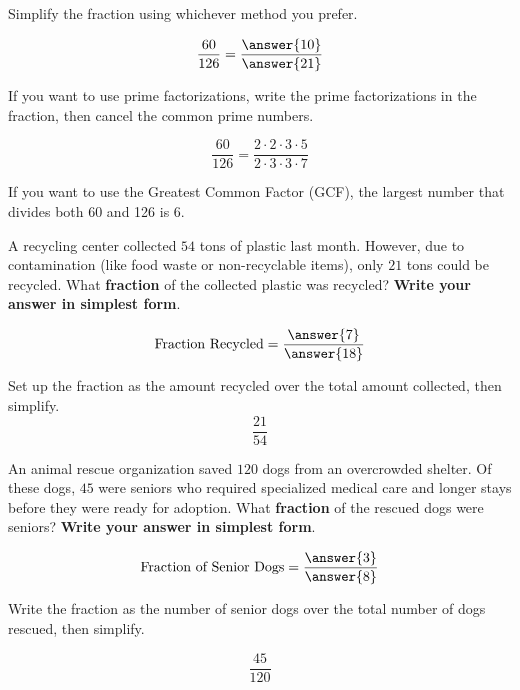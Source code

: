 \documentclass{ximera}[font=12pt]  %
\begin{document}
\begin{problem}
  Simplify the fraction using whichever method you prefer.


  \[ \frac{60}{126} = \frac{\answer{10}}{\answer{21}} \]

  \begin{hint}
   If you want to use prime factorizations, write the prime factorizations in the fraction, then cancel the common prime numbers.

    \[ \frac{60}{126} = \frac{2 \cdot 2 \cdot 3 \cdot 5}{2 \cdot 3 \cdot 3 \cdot 7} \]

  \end{hint}

  \begin{hint}
    If you want to use the Greatest Common Factor (GCF), the largest number that divides both 60 and 126 is 6.
  \end{hint}

\end{problem}


\begin{problem}
  A recycling center collected $54$ tons of plastic last month.  However, due to contamination (like food waste or non-recyclable items), 
  only $21$ tons could be recycled.  What \textbf{fraction} of the collected plastic was recycled?  \textbf{Write your answer in simplest form}.

  \[ \text{Fraction Recycled} = \frac{\answer{7}}{\answer{18}} \]

  \begin{hint}
    Set up the fraction as the amount recycled over the total amount collected, then simplify.
    \[ \frac{21}{54} \]
  \end{hint}

\end{problem}


\begin{problem}
An animal rescue organization saved $120$ dogs from an overcrowded shelter.  Of these dogs, $45$ were seniors who required specialized 
medical care and longer stays before they were ready for adoption.  What \textbf{fraction} of the rescued dogs were seniors?  
\textbf{Write your answer in simplest form}.

\[ \text{Fraction of Senior Dogs} = \frac{\answer{3}}{\answer{8}} \]

\begin{hint}
Write the fraction as the number of senior dogs over the total number of dogs rescued, then simplify.

\[ \frac{45}{120} \]
\end{hint}
\end{problem}
\end{document}
